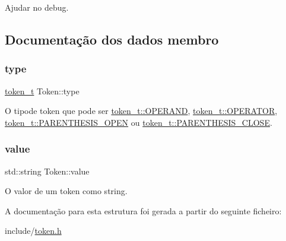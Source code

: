 Ajudar no debug. 



\subsection{Documentação dos dados membro}
\mbox{\label{structToken_adc09b3fa26576ee028d22b7ddc6aad69}} 
\subsubsection{\texorpdfstring{type}{type}}
{\footnotesize\ttfamily \hyperlink{structToken_a0c0bd3a78407f44bc1fd21a9da6bd85b}{token\+\_\+t} Token\+::type}



O tipode token que pode ser \hyperlink{structToken_a0c0bd3a78407f44bc1fd21a9da6bd85ba11f3de9b2b548c31805cf34d512ee177}{token\+\_\+t\+::\+O\+P\+E\+R\+A\+ND}, \hyperlink{structToken_a0c0bd3a78407f44bc1fd21a9da6bd85ba986496ca5b23669b8661171566a167c3}{token\+\_\+t\+::\+O\+P\+E\+R\+A\+T\+OR}, \hyperlink{structToken_a0c0bd3a78407f44bc1fd21a9da6bd85bacc3fdb5e3acc094388e75f45ada1a935}{token\+\_\+t\+::\+P\+A\+R\+E\+N\+T\+H\+E\+S\+I\+S\+\_\+\+O\+P\+EN} ou \hyperlink{structToken_a0c0bd3a78407f44bc1fd21a9da6bd85ba459697561df348fd7420e66ef9a339bf}{token\+\_\+t\+::\+P\+A\+R\+E\+N\+T\+H\+E\+S\+I\+S\+\_\+\+C\+L\+O\+SE}. 

\mbox{\label{structToken_a4b7142147b8598f8e24c404928d9263b}} 
\subsubsection{\texorpdfstring{value}{value}}
{\footnotesize\ttfamily std\+::string Token\+::value}



O valor de um token como string. 



A documentação para esta estrutura foi gerada a partir do seguinte ficheiro\+:\begin{DoxyCompactItemize}
\item 
include/\hyperlink{token_8h}{token.\+h}\end{DoxyCompactItemize}
